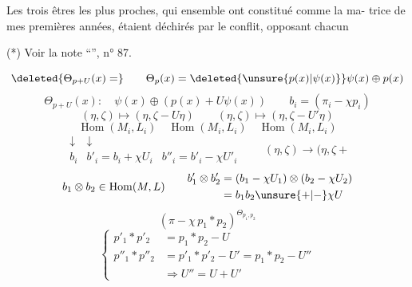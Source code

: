 Les trois êtres les plus proches, qui ensemble ont constitué comme la ma-\newline
trice de mes premières années, étaient déchirés par le conflit, opposant chacun

(*) Voir la note ``'', n° 87.

\[
\deleted{\Theta_{p+U}(x)=}\qquad
\Theta_p(x)=\deleted{\unsure{p(x)|\psi(x)}}\psi(x)\oplus p(x)
\]
\[
\Theta_{p+U}(x):\quad\psi(x)\oplus(p(x)+U\psi(x))
\qquad\boxed{b_i=(\pi_i-\chi p_i)}
\]
\[
(\eta,\zeta)\longmapsto(\eta,\zeta-U\eta)
\qquad(\eta,\zeta)\longmapsto(\eta,\zeta-U'\eta)
\]
\[
\operatorname{Hom}(M_i,L_i)\quad
\operatorname{Hom}(M_i,L_i)\quad\operatorname{Hom}(M_i,L_i)
\]
\[
\begin{array}{ccc}
\downarrow&\downarrow&\\
b_i&b'_i=b_i+\chi U_i&b''_i=b'_i-\chi U'_i
\end{array}
\qquad(\eta,\zeta)\longrightarrow(\eta,\zeta+
\]
\[
b_1\otimes b_2\in\operatorname{Hom}(M,L)
\qquad
\begin{aligned}
b'_1\otimes b'_2&=(b_1-\chi U_1)\otimes(b_2-\chi U_2)\\
&=b_1b_2\unsure{+|-}\chi U
\end{aligned}
\]
\[
(\pi-\chi\,p_1*p_2)^{\Theta_{p_1,p_2}}
\]
\[
\left\{\begin{aligned}
p'_1*p'_2&=p_1*p_2-U\\
p''_1*p''_2&=p'_1*p'_2-U'=p_1*p_2-U''\\
&\Longrightarrow U''=U+U'
\end{aligned}\right.
\]
